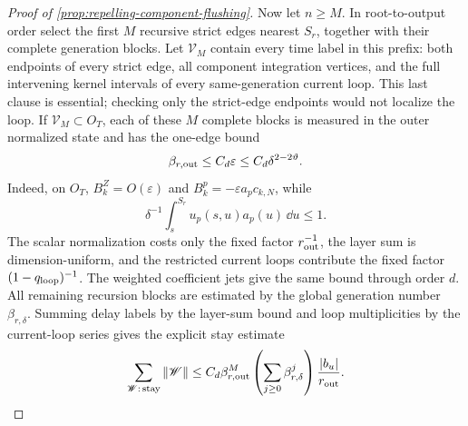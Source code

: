 \begin{proof}[Proof of
\cref{prop:repelling-component-flushing}]
Now let \(n\ge M\).  In root-to-output order select the first \(M\)
recursive strict edges nearest \(S_r\), together with their complete
generation blocks.  Let \(\mathcal V_M\) contain every time label in this
prefix: both endpoints of every strict edge, all component integration
vertices, and the full intervening kernel intervals of every same-generation
current loop.  This last clause is essential; checking only the strict-edge
endpoints would not localize the loop.  If
\(\mathcal V_M\subset O_T\), each of these \(M\) complete blocks is measured
in the outer normalized state and has the one-edge bound
\begin{equation}
 \beta_{r,\rm out}\le C_d\varepsilon
       \le C_d\delta^{2-2\vartheta}.               \label{eq:repelling-terminal-generation-number}
\end{equation}
Indeed, on \(O_T\),
\(B_k^Z=O(\varepsilon)\) and
\(B_k^p=-\varepsilon a_pc_{k,N}\), while
\[
 \delta^{-1}\int_s^{S_r}u_p(s,u)a_p(u)\,\dd u\le1.
\]
The scalar normalization costs only the fixed factor
\(r_{\rm out}^{-1}\), the layer sum is dimension-uniform, and the restricted
current loops contribute the fixed factor
\((1-q_{\rm loop})^{-1}\).  The weighted coefficient jets give the same
bound through order \(d\).
All remaining recursion blocks are estimated by the global generation
number \(\beta_{r,\delta}\).  Summing delay labels by the layer-sum bound and
loop multiplicities by the current-loop series gives the explicit stay
estimate
\begin{equation}
 \sum_{\mathscr W:\,{\rm stay}}\|\mathscr W\|
 \le C_d\beta_{r,\rm out}^M
       \left(\sum_{j\ge0}\beta_{r,\delta}^j\right)
       \frac{|b_u|}{r_{\rm out}}.                  \label{eq:repelling-terminal-stay-sum}
\end{equation}


\end{proof}
